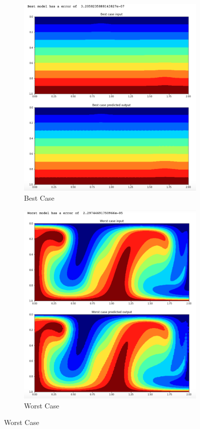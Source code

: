 \begin{figure}[H]
\centering
\begin{subfigure}{0.45\textwidth}
    \includegraphics[width=\textwidth]{Report LaTeX/figures/mantle_convection_images/larger_dataset/ConvAE_Best.png}
    \caption{Best Case}
    \label{fig:first}
\end{subfigure}
\hfill
\begin{subfigure}{0.45\textwidth}
    \includegraphics[width=\textwidth]{Report LaTeX/figures/mantle_convection_images/larger_dataset/ConvAE_Worst.png}
    \caption{Worst Case}
    \label{fig:second}
\end{subfigure}
        

\end{figure}
